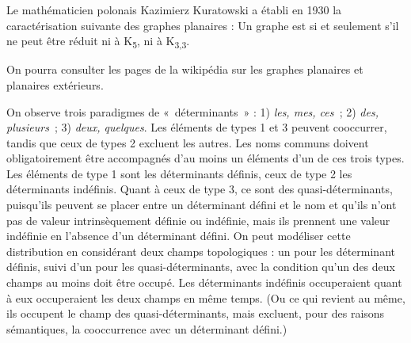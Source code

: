 {    \begin{center}
    \begin{minipage}[c]{.5\linewidth}\centering
    \end{minipage}\begin{minipage}[c]{.5\linewidth}\centering
    \end{minipage}
    \end{center}

    Le mathématicien polonais Kazimierz Kuratowski a établi en 1930 la caractérisation suivante des graphes planaires : Un graphe est  si et seulement s’il ne peut être réduit ni à K\textsubscript{5}, ni à K\textsubscript{3,3}.

    On pourra consulter les pages de la wikipédia sur les graphes planaires et planaires extérieurs.

     On observe trois paradigmes de «~déterminants~» : 1) \textit{les, mes, ces~}; 2) \textit{des, plusieurs~}; 3) \textit{deux, quelques}. Les éléments de types 1 et 3 peuvent cooccurrer, tandis que ceux de types 2 excluent les autres. Les noms communs doivent obligatoirement être accompagnés d’au moins un éléments d’un de ces trois types. Les éléments de type 1 sont les déterminants définis, ceux de type 2 les déterminants indéfinis. Quant à ceux de type 3, ce sont des quasi-déterminants, puisqu’ils peuvent se placer entre un déterminant défini et le nom et qu’ils n’ont pas de valeur intrinsèquement définie ou indéfinie, mais ils prennent une valeur indéfinie en l’absence d’un déterminant défini. On peut modéliser cette distribution en considérant deux champs topologiques : un pour les déterminant définis, suivi d’un pour les quasi-déterminants, avec la condition qu’un des deux champs au moins doit être occupé. Les déterminants indéfinis occuperaient quant à eux occuperaient les deux champs en même temps. (Ou ce qui revient au même, ils occupent le champ des quasi-déterminants, mais excluent, pour des raisons sémantiques, la cooccurrence avec un déterminant défini.)

}
